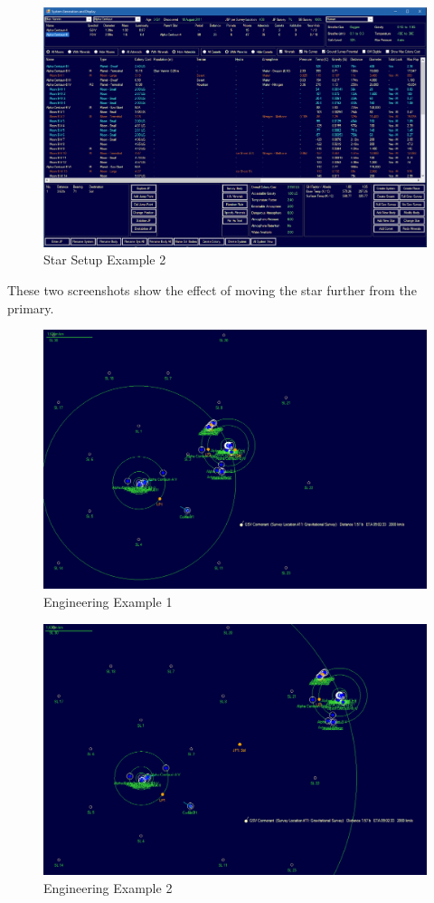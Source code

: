 \documentclass[../../Aurora C# unofficial manual.tex]{subfiles}
\begin{document}
	\begin{figure}[H]
		\centering
		\includegraphics[width=0.95\linewidth]{images/StarSetupExample2}
		\caption[Star Setup Example 2]{Star Setup Example 2}
		\label{fig:starsetupexample2}
	\end{figure}
	
	These two screenshots show the effect of moving the star further from the primary.
	\begin{figure}[H]
		\centering
		\includegraphics[width=0.95\linewidth]{images/Engineering003}
		\caption[Engineering Example]{Engineering Example 1}
		\label{fig:engineering003}
	\end{figure}
	\begin{figure}[H]
		\centering
		\includegraphics[width=0.95\linewidth]{images/Engineering004}
		\caption[Engineering Example 2]{Engineering Example 2}
		\label{fig:engineering004}
	\end{figure}
\end{document}
